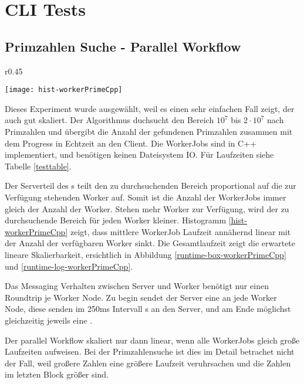 \clearpage
\section{CLI Tests}

\subsection{Primzahlen Suche - Parallel Workflow}
\label{M1}

\begin{wrapfigure}{r}{0.45\textwidth}
  \vspace{-30pt}
  \begin{center}
    \texttt{[image: hist-workerPrimeCpp]}
    \caption{Experiment \ref{M1} WorkerJob Laufzeiten aller 25 Iterationen in 50bins.}
    \label{hist-workerPrimeCpp}
  \end{center}
\end{wrapfigure}


Dieses Experiment wurde ausgewählt, weil es einen sehr einfachen Fall zeigt, der auch gut skaliert.
Der Algorithmus duchsucht den Bereich $10^{7}$ bis $2 \cdot 10^{7}$ nach Primzahlen und übergibt die Anzahl der gefundenen Primzahlen zusammen mit dem Progress in Echtzeit an den Client.
Die WorkerJobs sind in C++ implementiert, und benötigen keinen Dateisystem IO.
Für Laufzeiten siehe Tabelle \ref{testtable}.

Der Serverteil des \jobScript s teilt den zu durchsuchenden Bereich proportional auf die zur Verfügung stehenden Worker auf.
Somit ist die Anzahl der WorkerJobs immer gleich der Anzahl der Worker.
Stehen mehr Worker zur Verfügung, wird der zu durchsuchende Bereich für jeden Worker kleiner.
Histogramm \ref{hist-workerPrimeCpp} zeigt, dass mittlere WorkerJob Laufzeit annähernd linear mit der Anzahl der verfügbaren Worker sinkt.
Die Gesamtlaufzeit zeigt die erwartete lineare Skalierbarkeit, ersichtlich in Abbildung \ref{runtime-box-workerPrimeCpp} und \ref{runtime-log-workerPrimeCpp}.

Das Messaging Verhalten zwischen Server und Worker benötigt nur einen Roundtrip je Worker Node.
Zu begin sendet der Server eine \CallMessage{} an jede Worker Node, diese senden im 250ms Intervall \UpdateMessage s an den Server, und am Ende möglichst gleichzeitig jeweils eine \ReturnMessage.

Der parallel Workflow skaliert nur dann linear, wenn alle WorkerJobs gleich große Laufzeiten aufweisen.
Bei der Primzahlensuche ist dies im Detail betrachet nicht der Fall, weil großere Zahlen eine größere Laufzeit veruhrsachen und die Zahlen im letzten Block größer sind.


